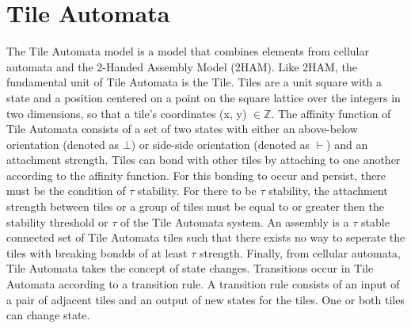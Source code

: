 \section{Tile Automata}\label{def:tile-automata}

The Tile Automata model is a model that combines elements from cellular automata and the 2-Handed Assembly Model (2HAM).  Like 2HAM, the fundamental unit of Tile Automata is the Tile.  Tiles are a unit square with a state and a position centered on a point on the square lattice over the integers in two dimensions, so that a tile's coordinates (x, y) $\in \mathbb{Z}$.  The affinity function of Tile Automata consists of a set of two states with either an above-below orientation (denoted as $\bot$) or side-side orientation (denoted as $\vdash$) and an attachment strength. Tiles can bond with other tiles by attaching to one another according to the affinity function.  For this bonding to occur and persist, there must be the condition of $\tau$ stability.  For there to be $\tau$ stability, the attachment strength between tiles or a group of tiles must be equal to or greater then the stability threshold or $\tau$ of the Tile Automata system.  An assembly is a $\tau$ stable connected set of Tile Automata tiles such that there exists no way to seperate the tiles with breaking bondds of at least $\tau$ strength.  Finally, from cellular automata, Tile Automata takes the concept of state changes.  Transitions occur in Tile Automata according to a transition rule.  A transition rule consists of an input of a pair of adjacent tiles and an output of new states for the tiles.  One or both tiles can change state.  